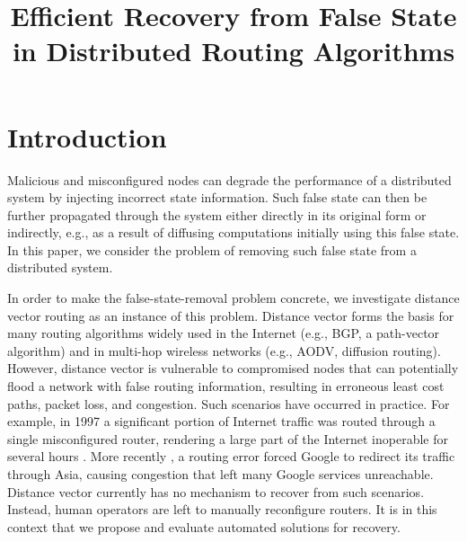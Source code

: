 \documentclass[10pt,conference]{IEEEtran}
\newcommand{\doctitle}{Efficient Recovery from False State in Distributed Routing Algorithms}
\begin{document}
\title{\doctitle}


\author{
} 

\maketitle



\section{Introduction}
\label{sec:intro}


Malicious and misconfigured nodes can degrade the performance of a distributed system by injecting incorrect state information. Such false state can then be further propagated 
through the system either directly in its original form or indirectly, e.g., as a result of diffusing computations initially using this false state.  In this paper, we consider 
the problem of removing such false state from a distributed system.

In order to make the false-state-removal problem concrete, we investigate distance vector routing as an instance of this problem. Distance vector forms the basis for many routing 
algorithms widely used in the Internet (e.g., BGP, a path-vector algorithm) and in multi-hop wireless networks (e.g., AODV, diffusion routing). However, distance vector is vulnerable 
to compromised nodes that can potentially flood a network with false routing information, resulting in erroneous least cost paths, packet loss, and congestion. Such scenarios have occurred
in practice. For example, in 1997 a significant portion of Internet traffic was routed through a single misconfigured router, rendering a large part of the Internet inoperable for several
hours \cite{Neumann97}. More recently \cite{Google}, a routing error forced Google to redirect its traffic through Asia, causing congestion that left many Google services unreachable. 
Distance vector currently has no mechanism to recover from such scenarios. Instead, human operators are left to manually reconfigure routers. It is in this context that we propose and
evaluate automated solutions for recovery.
\end{document}
